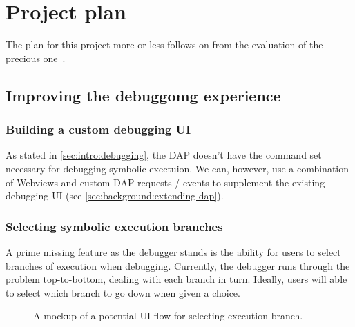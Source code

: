 \chapter{Project plan}
\label{cha:plan}

The plan for this project more or less follows on from the evaluation of the precious one~\cite{gillian-debugging-2021}.

\section{Improving the debuggomg experience}

\subsection{Building a custom debugging UI}

As stated in \autoref{sec:intro:debugging}, the DAP doesn't have the command
set necessary for debugging symbolic exectuion. We can, however, use a
combination of Webviews and custom DAP requests / events to supplement the
existing debugging UI (see \autoref{sec:background:extending-dap}).

\subsection{Selecting symbolic execution branches}

A prime missing feature as the debugger stands is the ability for users to select branches of execution when debugging. Currently, the debugger runs through the problem top-to-bottom, dealing with each branch in turn. Ideally, users will able to select which branch to go down when given a choice.

\begin{figure}
  \noindent
  \caption{A mockup of a potential UI flow for selecting execution branch.}
  \label{fig:branch-selection-mockup}
\end{figure}

